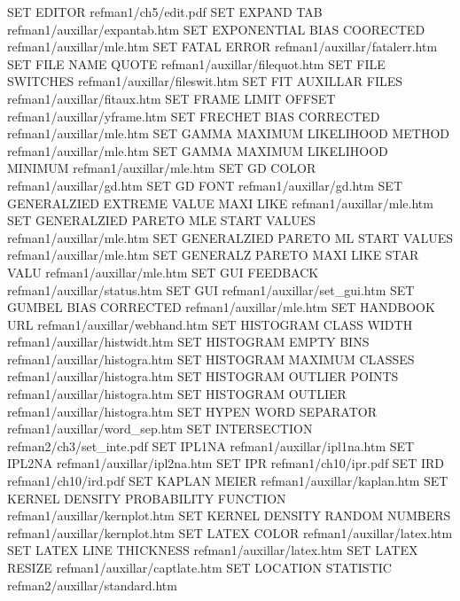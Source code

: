 SET EDITOR                              refman1/ch5/edit.pdf
SET EXPAND TAB                          refman1/auxillar/expantab.htm
SET EXPONENTIAL BIAS COORECTED          refman1/auxillar/mle.htm
SET FATAL ERROR                         refman1/auxillar/fatalerr.htm
SET FILE NAME QUOTE                     refman1/auxillar/filequot.htm
SET FILE SWITCHES                       refman1/auxillar/fileswit.htm
SET FIT AUXILLAR FILES                  refman1/auxillar/fitaux.htm
SET FRAME LIMIT OFFSET                  refman1/auxillar/yframe.htm
SET FRECHET BIAS CORRECTED              refman1/auxillar/mle.htm
SET GAMMA MAXIMUM LIKELIHOOD METHOD     refman1/auxillar/mle.htm
SET GAMMA MAXIMUM LIKELIHOOD MINIMUM    refman1/auxillar/mle.htm
SET GD COLOR                            refman1/auxillar/gd.htm
SET GD FONT                             refman1/auxillar/gd.htm
SET GENERALZIED EXTREME VALUE MAXI LIKE refman1/auxillar/mle.htm
SET GENERALZIED PARETO MLE START VALUES refman1/auxillar/mle.htm
SET GENERALZIED PARETO ML START VALUES  refman1/auxillar/mle.htm
SET GENERALZ PARETO MAXI LIKE STAR VALU refman1/auxillar/mle.htm
SET GUI FEEDBACK                        refman1/auxillar/status.htm
SET GUI                                 refman1/auxillar/set_gui.htm
SET GUMBEL BIAS CORRECTED               refman1/auxillar/mle.htm
SET HANDBOOK URL                        refman1/auxillar/webhand.htm
SET HISTOGRAM CLASS WIDTH               refman1/auxillar/histwidt.htm
SET HISTOGRAM EMPTY BINS                refman1/auxillar/histogra.htm
SET HISTOGRAM MAXIMUM CLASSES           refman1/auxillar/histogra.htm
SET HISTOGRAM OUTLIER POINTS            refman1/auxillar/histogra.htm
SET HISTOGRAM OUTLIER                   refman1/auxillar/histogra.htm
SET HYPEN WORD SEPARATOR                refman1/auxillar/word_sep.htm
SET INTERSECTION                        refman2/ch3/set_inte.pdf
SET IPL1NA                              refman1/auxillar/ipl1na.htm
SET IPL2NA                              refman1/auxillar/ipl2na.htm
SET IPR                                 refman1/ch10/ipr.pdf
SET IRD                                 refman1/ch10/ird.pdf
SET KAPLAN MEIER                        refman1/auxillar/kaplan.htm
SET KERNEL DENSITY PROBABILITY FUNCTION refman1/auxillar/kernplot.htm
SET KERNEL DENSITY RANDOM NUMBERS       refman1/auxillar/kernplot.htm
SET LATEX COLOR                         refman1/auxillar/latex.htm
SET LATEX LINE THICKNESS                refman1/auxillar/latex.htm
SET LATEX RESIZE                        refman1/auxillar/captlate.htm
SET LOCATION STATISTIC                  refman2/auxillar/standard.htm
